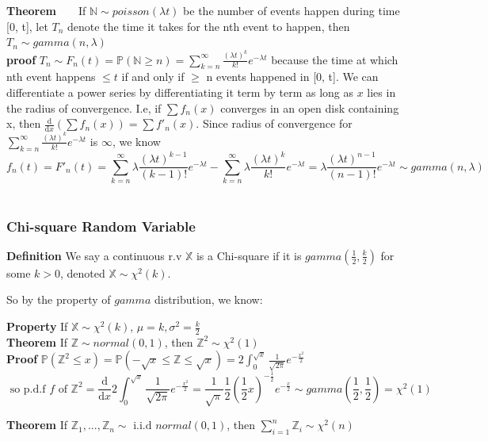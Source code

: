 \documentclass[a4paper,12pt]{article}
\begin{document}
\textbf{Theorem}\ \ \ \ 
If $\mathbb{N} \sim poisson(\lambda t)$ be the number of events happen during time [0, t], let $T_n$ denote the time it takes for the nth event to happen, then $T_n \sim gamma(n, \lambda)$\\

\textbf{proof} $T_n \sim F_n(t) = \mathbb{P}( \mathbb{N} \geq n ) = \sum_{k=n}^\infty \frac{(\lambda t)^k}{k!}e^{-\lambda t}$ because the time at which nth event happens $\leq t$ if and only if $\geq$ n events happened in [0, t]. We can differentiate a power series by differentiating it term by term as long as $x$ lies in the radius of convergence. I.e, if $\sum f_n(x) $ converges in an open disk containing x, then $ \frac{\mathrm{d}}{\mathrm{d} x} ( \sum f_n(x) ) = \sum f'_n(x) $. Since radius of convergence for $\sum_{k=n}^\infty \frac{(\lambda t)^k}{k!}e^{-\lambda t}$ is $\infty$, we know $$f_n(t) = F'_n(t) = \sum_{k=n}^\infty \lambda\frac{(\lambda t)^{k-1}}{(k-1)!}e^{-\lambda t}  - \sum_{k=n}^\infty \lambda\frac{(\lambda t)^k}{k!}e^{-\lambda t} = \lambda\frac{(\lambda t)^{n-1}}{(n-1)!}e^{-\lambda t} \sim gamma(n, \lambda)$$\\

\subsubsection{Chi-square Random Variable }
\textbf{Definition} We say a continuous r.v $\mathbb{X}$ is a Chi-square if it is $gamma( \frac{1}{2}, \frac{k}{2} )$ for some $k > 0$, denoted $\mathbb{X} \sim \chi^2(k)$.

So by the property of $gamma$ distribution, we know:

\textbf{Property} If $\mathbb{X} \sim \chi^2(k)$, $\mu = k, \sigma^2 = \frac{k}{2}$\\

\textbf{Theorem} If $\mathbb{Z} \sim normal(0, 1)$, then $\mathbb{Z}^2 \sim \chi^2(1)$\\

\textbf{Proof} $\mathbb{P}(\mathbb{Z}^2 \leq x) = \mathbb{P}(-\sqrt{x} \leq \mathbb{Z} \leq \sqrt{x}) =  2\int_0^{\sqrt{x}} \frac{1}{\sqrt{2\pi}}e^{-\frac{x^2}{2}} $
$$ \text{ so p.d.f } f \text{ of } \mathbb{Z}^2 = \frac{\mathrm{d}}{\mathrm{d}x}2\int_0^{\sqrt{x}} \frac{1}{\sqrt{2\pi}}e^{-\frac{x^2}{2}} = \frac{1}{\sqrt{\pi}}\frac{1}{2}(\frac{1}{2} x)^{-\frac{1}{2}}e^{-\frac{x}{2}} \sim gamma(\frac{1}{2}, \frac{1}{2}) = \chi^2(1)$$

\textbf{Theorem} If $\mathbb{Z}_1, ..., \mathbb{Z}_n \sim \text{ i.i.d } normal(0, 1)$, then $\sum_{i=1}^n \mathbb{Z}_i \sim \chi^2(n)$\\
\end{document}
